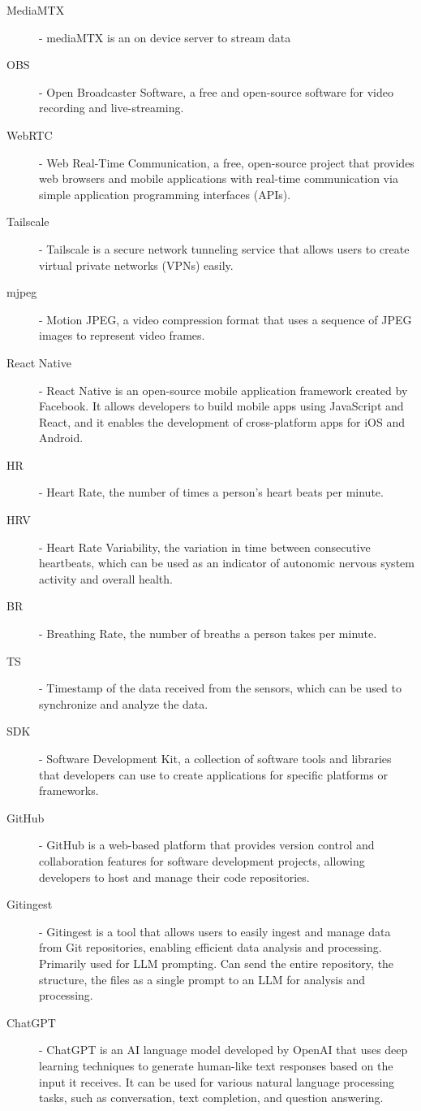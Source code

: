 \documentclass[
	fontsize=15pt,
	twoside=false,
	secnumdepth=2
]{kaobook}
\begin{document}
\begin{description}
  \item[MediaMTX]  - mediaMTX is an on device server to stream data
  \item[OBS] - Open Broadcaster Software, a free and open-source software for video recording and live-streaming.
  \item[WebRTC] - Web Real-Time Communication, a free, open-source project that provides web browsers and mobile applications with real-time communication via simple application programming interfaces (APIs).
  \item[Tailscale] - Tailscale is a secure network tunneling service that allows users to create virtual private networks (VPNs) easily.
  \item[mjpeg] - Motion JPEG, a video compression format that uses a sequence of JPEG images to represent video frames.
  \item[React Native] - React Native is an open-source mobile application framework created by Facebook. It allows developers to build mobile apps using JavaScript and React, and it enables the development of cross-platform apps for iOS and Android.
  \item[HR] - Heart Rate, the number of times a person's heart beats per minute.
  \item[HRV] - Heart Rate Variability, the variation in time between consecutive heartbeats, which can be used as an indicator of autonomic nervous system activity and overall health.
  \item[BR] - Breathing Rate, the number of breaths a person takes per minute.
  \item[TS] - Timestamp of the data received from the sensors, which can be used to synchronize and analyze the data.
  \item[SDK] - Software Development Kit, a collection of software tools and libraries that developers can use to create applications for specific platforms or frameworks.
  \item[GitHub] - GitHub is a web-based platform that provides version control and collaboration features for software development projects, allowing developers to host and manage their code repositories.
  \item[Gitingest] - Gitingest is a tool that allows users to easily ingest and manage data from Git repositories, enabling efficient data analysis and processing. Primarily used for LLM prompting. Can send the entire repository, the structure, the files as a single prompt to an LLM for analysis and processing.
  \item[ChatGPT] - ChatGPT is an AI language model developed by OpenAI that uses deep learning techniques to generate human-like text responses based on the input it receives. It can be used for various natural language processing tasks, such as conversation, text completion, and question answering.

\end{description}
\end{document}
